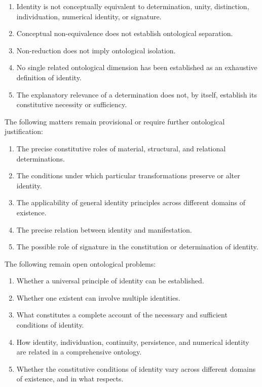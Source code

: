 \begin{enumerate}
    \item Identity is not conceptually equivalent
    to determination, unity, distinction,
    individuation, numerical identity, or signature.

    \item Conceptual non-equivalence does not
    establish ontological separation.

    \item Non-reduction does not imply
    ontological isolation.

    \item No single related ontological dimension
    has been established as an exhaustive
    definition of identity.

    \item The explanatory relevance of a
    determination does not, by itself, establish
    its constitutive necessity or sufficiency.
\end{enumerate}

The following matters remain provisional or
require further ontological justification:

\begin{enumerate}
    \item The precise constitutive roles of
    material, structural, and relational
    determinations.

    \item The conditions under which particular
    transformations preserve or alter identity.

    \item The applicability of general identity
    principles across different domains of existence.

    \item The precise relation between identity
    and manifestation.

    \item The possible role of signature in the
    constitution or determination of identity.
\end{enumerate}

The following remain open ontological problems:

\begin{enumerate}
    \item Whether a universal principle of identity
    can be established.

    \item Whether one existent can involve
    multiple identities.

    \item What constitutes a complete account
    of the necessary and sufficient conditions
    of identity.

    \item How identity, individuation, continuity,
    persistence, and numerical identity are
    related in a comprehensive ontology.

    \item Whether the constitutive conditions of
    identity vary across different domains of
    existence, and in what respects.
\end{enumerate}

